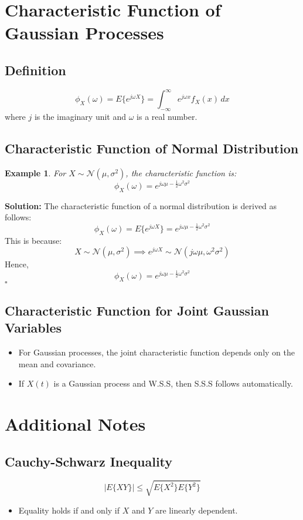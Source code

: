 \documentclass[12pt]{article}
\newtheorem{example}{Example}
\newenvironment{solution}{\noindent\textbf{Solution:}}{\hfill$\square$}
\begin{document}
\section{Characteristic Function of Gaussian Processes}

\subsection{Definition}
\[
\phi_X(\omega) = E\{e^{j\omega X}\} = \int_{-\infty}^{\infty} e^{j\omega x} f_X(x) \, dx
\]
where \( j \) is the imaginary unit and \( \omega \) is a real number.

\subsection{Characteristic Function of Normal Distribution}
\begin{example}
For \( X \sim \mathcal{N}(\mu, \sigma^2) \), the characteristic function is:
\[
\phi_X(\omega) = e^{j\omega\mu - \frac{1}{2} \omega^2 \sigma^2}
\]
\end{example}
\begin{solution}
The characteristic function of a normal distribution is derived as follows:
\[
\phi_X(\omega) = E\{e^{j\omega X}\} = e^{j\omega\mu - \frac{1}{2} \omega^2 \sigma^2}
\]
This is because:
\[
X \sim \mathcal{N}(\mu, \sigma^2) \implies e^{j\omega X} \sim \mathcal{N}(j\omega\mu, \omega^2 \sigma^2)
\]
Hence,
\[
\phi_X(\omega) = e^{j\omega\mu - \frac{1}{2} \omega^2 \sigma^2}
\]
\end{solution}

\subsection{Characteristic Function for Joint Gaussian Variables}
\begin{itemize}
    \item For Gaussian processes, the joint characteristic function depends only on the mean and covariance.
    \item If \( X(t) \) is a Gaussian process and W.S.S, then S.S.S follows automatically.
\end{itemize}

\section{Additional Notes}

\subsection{Cauchy-Schwarz Inequality}
\[
|E\{XY\}| \leq \sqrt{E\{X^2\} E\{Y^2\}}
\]
\begin{itemize}
    \item Equality holds if and only if \( X \) and \( Y \) are linearly dependent.
\end{itemize}
\end{document}
